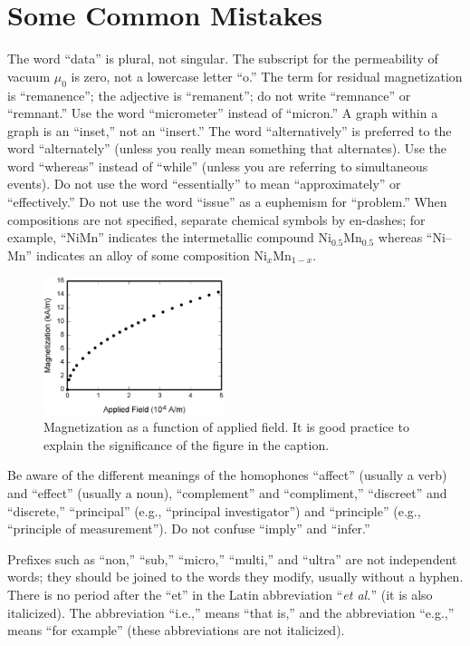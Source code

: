 \documentclass{ieeeojies}
\begin{document}
\section{Some Common Mistakes}
The word ``data'' is plural, not singular. The subscript for the
permeability of vacuum $\mu _{0}$ is zero, not a lowercase letter
``o.'' The term for residual magnetization is ``remanence''; the adjective
is ``remanent''; do not write ``remnance'' or ``remnant.'' Use the word
``micrometer'' instead of ``micron.'' A graph within a graph is an
``inset,'' not an ``insert.'' The word ``alternatively'' is preferred to the
word ``alternately'' (unless you really mean something that alternates). Use
the word ``whereas'' instead of ``while'' (unless you are referring to
simultaneous events). Do not use the word ``essentially'' to mean
``approximately'' or ``effectively.'' Do not use the word ``issue'' as a
euphemism for ``problem.'' When compositions are not specified, separate
chemical symbols by en-dashes; for example, ``NiMn'' indicates the
intermetallic compound Ni$_{0.5}$Mn$_{0.5}$ whereas
``Ni--Mn'' indicates an alloy of some composition
Ni$_{x}$Mn$_{1-x}$.


\begin{figure}[!t]
	\centering
	\includegraphics[width=0.47\textwidth]{fig1.eps}
	\caption{Magnetization as a function of applied field.
It is good practice to explain the significance of the figure in the caption.}
	\label{fig1}
\end{figure}


Be aware of the different meanings of the homophones ``affect'' (usually a
verb) and ``effect'' (usually a noun), ``complement'' and ``compliment,''
``discreet'' and ``discrete,'' ``principal'' (e.g., ``principal
investigator'') and ``principle'' (e.g., ``principle of measurement''). Do
not confuse ``imply'' and ``infer.''

Prefixes such as ``non,'' ``sub,'' ``micro,'' ``multi,'' and ``ultra'' are
not independent words; they should be joined to the words they modify,
usually without a hyphen. There is no period after the ``et'' in the Latin
abbreviation ``\emph{et al.}'' (it is also italicized). The abbreviation ``i.e.,'' means
``that is,'' and the abbreviation ``e.g.,'' means ``for example'' (these
abbreviations are not italicized).
\end{document}
